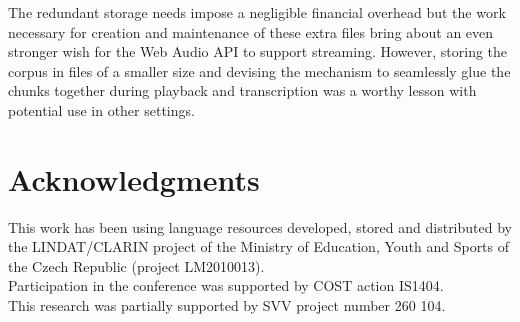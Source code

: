 \documentclass{llncs}
\begin{document}
The redundant storage needs impose a negligible financial overhead but the work necessary for creation and maintenance of these extra files bring about an even stronger wish for the Web Audio API to support streaming. However, storing the corpus in files of a smaller size and devising the mechanism to seamlessly glue the chunks together during playback and transcription was a worthy lesson with potential use in other settings.

%
%


\section*{Acknowledgments}

This work has been using language resources developed, stored and distributed by the LINDAT/CLARIN project of the Ministry of Education, Youth and Sports of the Czech Republic (project LM2010013).
\\
Participation in the conference was supported by COST action IS1404.
\\
This research was partially supported by SVV project number 260 104.




\end{document}
